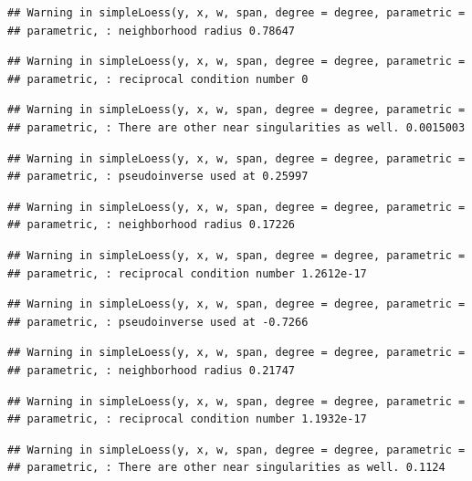 \documentclass[]{article}
\begin{document}
\begin{verbatim}
## Warning in simpleLoess(y, x, w, span, degree = degree, parametric =
## parametric, : neighborhood radius 0.78647
\end{verbatim}

\begin{verbatim}
## Warning in simpleLoess(y, x, w, span, degree = degree, parametric =
## parametric, : reciprocal condition number 0
\end{verbatim}

\begin{verbatim}
## Warning in simpleLoess(y, x, w, span, degree = degree, parametric =
## parametric, : There are other near singularities as well. 0.0015003
\end{verbatim}

\begin{verbatim}
## Warning in simpleLoess(y, x, w, span, degree = degree, parametric =
## parametric, : pseudoinverse used at 0.25997
\end{verbatim}

\begin{verbatim}
## Warning in simpleLoess(y, x, w, span, degree = degree, parametric =
## parametric, : neighborhood radius 0.17226
\end{verbatim}

\begin{verbatim}
## Warning in simpleLoess(y, x, w, span, degree = degree, parametric =
## parametric, : reciprocal condition number 1.2612e-17
\end{verbatim}

\begin{verbatim}
## Warning in simpleLoess(y, x, w, span, degree = degree, parametric =
## parametric, : pseudoinverse used at -0.7266
\end{verbatim}

\begin{verbatim}
## Warning in simpleLoess(y, x, w, span, degree = degree, parametric =
## parametric, : neighborhood radius 0.21747
\end{verbatim}

\begin{verbatim}
## Warning in simpleLoess(y, x, w, span, degree = degree, parametric =
## parametric, : reciprocal condition number 1.1932e-17
\end{verbatim}

\begin{verbatim}
## Warning in simpleLoess(y, x, w, span, degree = degree, parametric =
## parametric, : There are other near singularities as well. 0.1124
\end{verbatim}
\end{document}
